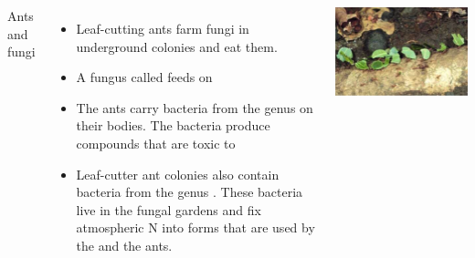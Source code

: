 \begin{frame}[t]
    \begin{adjustwidth}{-2em}{-1.5em}
        \vspace{-4mm}
        \begin{columns}


            Ants and fungi

            \begin{itemize}[<+->]
                \item Leaf-cutting ants farm 
                    fungi in underground colonies and eat them.

                \item A fungus called  feeds on

                \item The ants carry bacteria from the genus
                     on their bodies. The
                    bacteria produce compounds that are toxic
                    to 

                \item Leaf-cutter ant colonies also contain bacteria from the
                    genus . These bacteria live in the fungal
                    gardens and fix atmospheric N into forms that are
                    used by the  and the ants.
            \end{itemize}


            \begin{center}
            \includegraphics[height=0.31\textheight]{ants-1.png}


\end{center}
\end{columns}
\end{adjustwidth}
\end{frame}

